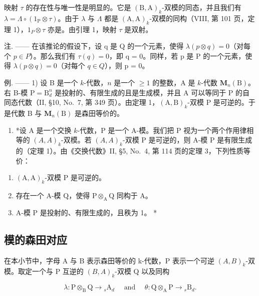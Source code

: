 映射 \(\tau\) 的存在性与唯一性是明显的。它是 \((\mathrm{B},\mathrm{A})_{k}\)-双模的同态，并且我们有 \(\lambda=\Lambda\circ(1_{\mathrm{P}}\otimes\tau)\)。由于 \(\lambda\) 与 \(\Lambda\) 都是 \((\mathrm{A},\mathrm{A})_{k}\)-双模的同构（VIII, 第 101 页，定理 1），\(1_{P}\otimes\tau\) 亦是。由引理 1，映射 \(\tau\) 是双射。

注. —— 在该推论的假设下，设 q 是 Q 的一个元素，使得 \(\lambda(p \otimes q) = 0\)（对每个 \(p \in P\)）。那么我们有 \(\tau(q) = 0\)，即 q = 0。同样，若 p 是 P 的一个元素，使得 \(\lambda(p \otimes q) = 0\)（对每个 \(q \in Q\)），则 p = 0。

例. —— 1) 设 B 是一个 \(k\)-代数，\(n\) 是一个 \(\geqslant 1\) 的整数，A 是 \(k\)-代数 \(\mathbf{M}_n(\mathrm{B})\)。右 B-模 \(\mathrm{P} = \mathrm{B}_d^n\) 是投射的、有限生成的且是生成模，并且 A 可以等同于 P 的自同态代数（II, §10, No.~7, 第 349 页）。由定理 1，\((\mathrm{A},\mathrm{B})_k\)-双模 P 是可逆的。于是代数 B 与 \(\mathbf{M}_n(\mathrm{B})\) 是森田等价的。

\begin{enumerate}
\def\labelenumi{\arabic{enumi})}
\setcounter{enumi}{1}
\tightlist
\item
  *设 A 是一个交换 \(k\)-代数，P 是一个 A-模。我们把 P 视为一个两个作用律相等的 \((A, A)_k\)-双模。若 \((A, A)_k\)-双模 P 是可逆的，则 A-模 P 是有限生成的（定理 1）。由《交换代数》II, §5, No.~4, 第 114 页的定理 3，下列性质等价：
\end{enumerate}

\begin{enumerate}
\def\labelenumi{(\roman{enumi})}
\item
  \((\mathrm{A},\mathrm{A})_{k}\)-双模 P 是可逆的。
\item
  存在一个 A-模 \(\mathrm{Q}\)，使得 \(\mathrm{P} \otimes_{\mathrm{A}} \mathrm{Q}\) 同构于 \(\mathrm{A}\)。
\item
  A-模 P 是投射的、有限生成的，且秩为 1。 *
\end{enumerate}

\subsection{模的森田对应}

在本小节中，字母 A 与 B 表示森田等价的 k-代数，P 表示一个可逆 \((A,B)_{k}\)-双模。取定一个与 P 互逆的 \((B,A)_{k}\)-双模 Q 以及同构

\[
\lambda : \mathrm{P} \otimes_ {\mathrm{B}} \mathrm{Q} \rightarrow {} _ {s} \mathrm{A} _ {d} \quad \text { and } \quad \theta : \mathrm{Q} \otimes_ {\mathrm{A}} \mathrm{P} \rightarrow {} _ {s} \mathrm{B} _ {d}.
\]


